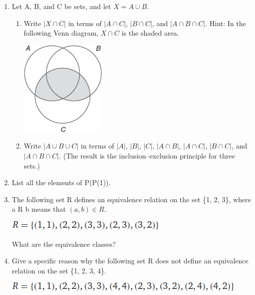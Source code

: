 \documentclass[12pt]{article}
\begin{document}
\begin{enumerate}
    \newpage    

    \item Let A, B, and C be sets, and let $X = A \cup B$.
    \begin{enumerate}
        \item Write $|X \cap C|$ in terms of $|A \cap C|$, $|B \cap C|$, and $|A \cap B \cap C|$. Hint: In the following Venn diagram, $X \cap C$ is the shaded area.
        \begin{center}
            \includegraphics[scale=0.7]{img/img-4.png}
        \end{center}
        \item Write $|A \cup B \cup C|$ in terms of $|A|$, $|B|$, $|C|$, $|A \cap B|$, $|A \cap C|$, $|B \cap C|$, and $|A \cap B \cap C|$. (The result is the inclusion–exclusion principle for three sets.)
    \end{enumerate}

    \item List all the elements of P(P({1})).
    \item The following set R defines an equivalence relation on the set \{1, 2, 3\}, where a R b means that $(a, b) \in R$.
        \begin{center}
            \includegraphics[scale=3]{img/img-5.png}
        \end{center}
        What are the equivalence classes?

    \item Give a specific reason why the following set R does not define an equivalence relation on the set \{1, 2, 3, 4\}.
    \begin{center}
        \includegraphics[scale=3]{img/img-6.png}
    \end{center}


\end{enumerate}
\end{document}
